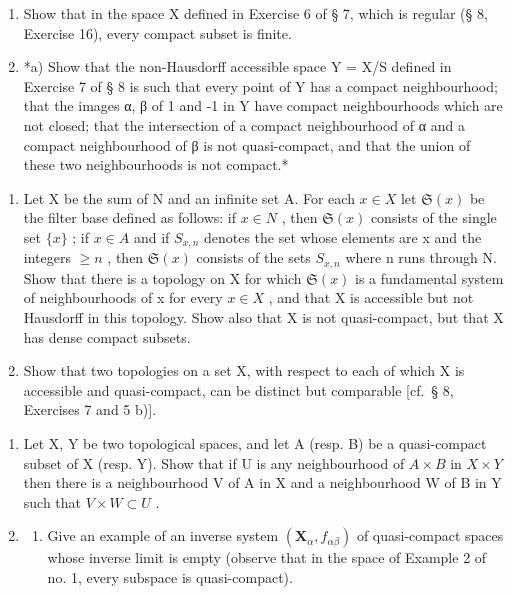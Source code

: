 \begin{enumerate}
\def\labelenumi{\arabic{enumi})}
\setcounter{enumi}{3}
\item
  Show that in the space X defined in Exercise 6 of § 7, which is regular (§ 8, Exercise 16), every compact subset is finite.
\item
  *a) Show that the non-Hausdorff accessible space Y = X/S defined in Exercise 7 of § 8 is such that every point of Y has a compact neighbourhood; that the images α, β of 1 and -1 in Y have compact neighbourhoods which are not closed; that the intersection of a compact neighbourhood of α and a compact neighbourhood of β is not quasi-compact, and that the union of these two neighbourhoods is not compact.*
\end{enumerate}

\begin{enumerate}
\def\labelenumi{\alph{enumi})}
\setcounter{enumi}{1}
\item
  Let X be the sum of N and an infinite set A. For each \(x \in X\) let \(\mathfrak{S}(x)\) be the filter base defined as follows: if \(x \in N\) , then \(\mathfrak{S}(x)\) consists of the single set \(\{x\}\) ; if \(x \in A\) and if \(S_{x,n}\) denotes the set whose elements are x and the integers \(\geqslant n\) , then \(\mathfrak{S}(x)\) consists of the sets \(S_{x,n}\) where n runs through N. Show that there is a topology on X for which \(\mathfrak{S}(x)\) is a fundamental system of neighbourhoods of x for every \(x \in X\) , and that X is accessible but not Hausdorff in this topology. Show also that X is not quasi-compact, but that X has dense compact subsets.
\item
  Show that two topologies on a set X, with respect to each of which X is accessible and quasi-compact, can be distinct but comparable {[}cf.~§ 8, Exercises 7 and 5 b){]}.
\end{enumerate}

\begin{enumerate}
\def\labelenumi{\arabic{enumi})}
\setcounter{enumi}{5}
\item
  Let X, Y be two topological spaces, and let A (resp. B) be a quasi-compact subset of X (resp. Y). Show that if U is any neighbourhood of \(A \times B\) in \(X \times Y\) then there is a neighbourhood V of A in X and a neighbourhood W of B in Y such that \(V \times W \subset U\) .
\item
  \begin{enumerate}
  \def\labelenumii{\alph{enumii})}
  \tightlist
  \item
    Give an example of an inverse system \((\mathbf{X}_{\alpha}, f_{\alpha\beta})\) of quasi-compact spaces whose inverse limit is empty (observe that in the space of Example 2 of no. 1, every subspace is quasi-compact).
  \end{enumerate}
\end{enumerate}

